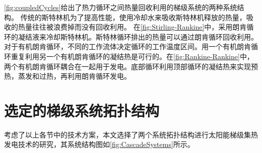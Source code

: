\autoref{fig:coupledCycles}给出了热力循环之间热量回收利用的梯级系统的两种系统结构。
传统的斯特林机为了提高性能，使用冷却水来吸收斯特林机释放的热量，吸收的热量往往被浪费掉而没有回收利用。
在\autoref{fig:Stirling-Rankine}中，采用朗肯循环的凝结液来冷却斯特林机。斯特林循环排出的热量可以通过朗肯循环回收利用。
对于有机朗肯循环，不同的工作流体决定循环的工作温度区间。用一个有机朗肯循环重复利用另一个有机朗肯循环的凝结热是可行的。在\autoref{fig:Rankine-Rankine}中，两个有机朗肯循环耦合在一起用于发电。底部循环利用顶部循环的凝结热来实现预热，蒸发和过热，再利用朗肯循环发电。

\section{选定的梯级系统拓扑结构}
\label{sec:sst}

考虑了以上各节中的技术方案，本文选择了两个系统拓扑结构进行太阳能梯级集热发电技术的研究，其系统结构图如\autoref{fig:CascadeSystems}所示。

